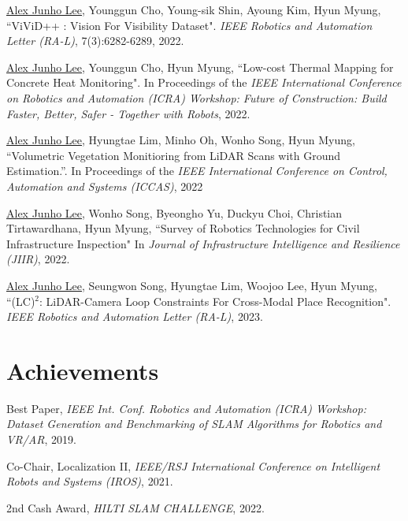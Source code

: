 \documentclass[margin]{res}
\begin{document}
\begin{resume}
		\par\underline{Alex Junho Lee}, Younggun Cho, Young-sik Shin, Ayoung Kim, Hyun Myung, ``ViViD++ : Vision For Visibility Dataset". \textit{IEEE Robotics and Automation Letter (RA-L)}, 7(3):6282-6289, 2022.
		
		\par\underline{Alex Junho Lee}, Younggun Cho, Hyun Myung, ``Low-cost Thermal Mapping for Concrete Heat Monitoring". In Proceedings of the \textit{IEEE International Conference on Robotics and Automation (ICRA) Workshop: Future of Construction: Build Faster, Better, Safer - Together with Robots}, 2022.
		
		\par\underline{Alex Junho Lee}, Hyungtae Lim, Minho Oh, Wonho Song, Hyun Myung, ``Volumetric Vegetation Monitioring from LiDAR Scans with Ground Estimation.''. In Proceedings of the \textit{IEEE International Conference on Control, Automation and Systems (ICCAS)}, 2022
		
		\par\underline{Alex Junho Lee}, Wonho Song, Byeongho Yu, Duckyu Choi, Christian Tirtawardhana, Hyun Myung, ``Survey of Robotics Technologies for Civil Infrastructure Inspection" In \textit{Journal of Infrastructure Intelligence and Resilience (JIIR)}, 2022.
		
		\par\underline{Alex Junho Lee}, Seungwon Song, Hyungtae Lim, Woojoo Lee, Hyun Myung, ``(LC)$^2$: LiDAR-Camera Loop Constraints
		For Cross-Modal Place Recognition". \textit{IEEE Robotics and Automation Letter (RA-L)}, 2023.
		
		\newpage
		\section{Achievements}
		
		\par Best Paper,\textit{ IEEE Int. Conf. Robotics and Automation (ICRA) Workshop: Dataset Generation and Benchmarking of SLAM Algorithms for Robotics and VR/AR}, 2019.
						
		\par Co-Chair, Localization II, \textit{IEEE/RSJ International Conference on Intelligent Robots and Systems (IROS)}, 2021.
		
		\par 2nd Cash Award, \textit{HILTI SLAM CHALLENGE}, 2022.


\end{resume}
\end{document}

